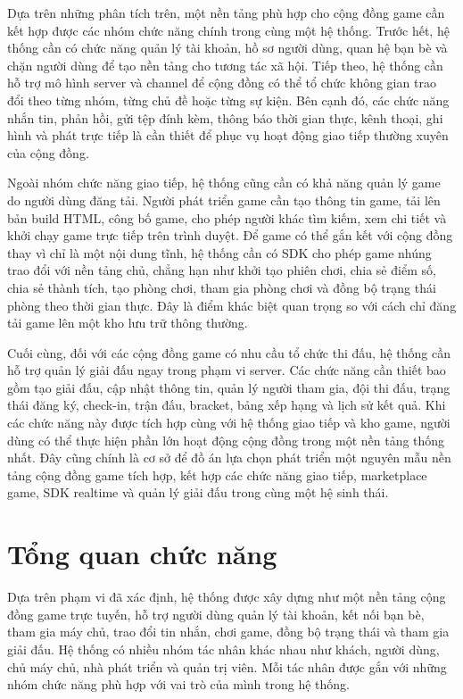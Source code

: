 \documentclass[../DoAn.tex]{subfiles}
\begin{document}
Dựa trên những phân tích trên, một nền tảng phù hợp cho cộng đồng game cần kết hợp được các nhóm chức năng chính trong cùng một hệ thống. Trước hết, hệ thống cần có chức năng quản lý tài khoản, hồ sơ người dùng, quan hệ bạn bè và chặn người dùng để tạo nền tảng cho tương tác xã hội. Tiếp theo, hệ thống cần hỗ trợ mô hình server và channel để cộng đồng có thể tổ chức không gian trao đổi theo từng nhóm, từng chủ đề hoặc từng sự kiện. Bên cạnh đó, các chức năng nhắn tin, phản hồi, gửi tệp đính kèm, thông báo thời gian thực, kênh thoại, ghi hình và phát trực tiếp là cần thiết để phục vụ hoạt động giao tiếp thường xuyên của cộng đồng.

Ngoài nhóm chức năng giao tiếp, hệ thống cũng cần có khả năng quản lý game do người dùng đăng tải. Người phát triển game cần tạo thông tin game, tải lên bản build HTML, công bố game, cho phép người khác tìm kiếm, xem chi tiết và khởi chạy game trực tiếp trên trình duyệt. Để game có thể gắn kết với cộng đồng thay vì chỉ là một nội dung tĩnh, hệ thống cần có SDK cho phép game nhúng trao đổi với nền tảng chủ, chẳng hạn như khởi tạo phiên chơi, chia sẻ điểm số, chia sẻ thành tích, tạo phòng chơi, tham gia phòng chơi và đồng bộ trạng thái phòng theo thời gian thực. Đây là điểm khác biệt quan trọng so với cách chỉ đăng tải game lên một kho lưu trữ thông thường.

Cuối cùng, đối với các cộng đồng game có nhu cầu tổ chức thi đấu, hệ thống cần hỗ trợ quản lý giải đấu ngay trong phạm vi server. Các chức năng cần thiết bao gồm tạo giải đấu, cập nhật thông tin, quản lý người tham gia, đội thi đấu, trạng thái đăng ký, check-in, trận đấu, bracket, bảng xếp hạng và lịch sử kết quả. Khi các chức năng này được tích hợp cùng với hệ thống giao tiếp và kho game, người dùng có thể thực hiện phần lớn hoạt động cộng đồng trong một nền tảng thống nhất. Đây cũng chính là cơ sở để đồ án lựa chọn phát triển một nguyên mẫu nền tảng cộng đồng game tích hợp, kết hợp các chức năng giao tiếp, marketplace game, SDK realtime và quản lý giải đấu trong cùng một hệ sinh thái.

\section{Tổng quan chức năng}
\label{section:2.2}

Dựa trên phạm vi đã xác định, hệ thống được xây dựng như một nền tảng cộng đồng game trực tuyến, hỗ trợ người dùng quản lý tài khoản, kết nối bạn bè, tham gia máy chủ, trao đổi tin nhắn, chơi game, đồng bộ trạng thái và tham gia giải đấu. Hệ thống có nhiều nhóm tác nhân khác nhau như khách, người dùng, chủ máy chủ, nhà phát triển và quản trị viên. Mỗi tác nhân được gắn với những nhóm chức năng phù hợp với vai trò của mình trong hệ thống.
\end{document}
